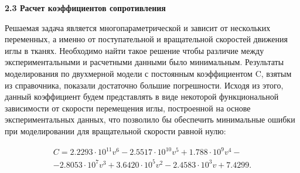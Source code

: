 \documentclass[10pt]{article}
\begin{document}
\bigskip
\textbf{2.3 Расчет коэффициентов сопротивления}

Решаемая задача является многопараметрической и зависит от нескольких переменных, а именно от поступательной и вращательной скоростей движения иглы в тканях. Необходимо найти такое решение чтобы различие между экспериментальными и расчетными данными было минимальным. 
Результаты моделирования по двухмерной модели с постоянным коэффициентом C, взятым из справочника, показали достаточно большие погрешности. Исходя из этого, данный коэффициент будем представлять в виде некоторой функциональной зависимости от скорости перемещения иглы, построенной на основе экспериментальных данных, что позволило бы обеспечить минимальные ошибки при моделировании для вращательной скорости равной нулю:

\begin{multline} \label{eq11}
C= 2.2293\cdot10^{11} v^6 - 2.5517\cdot10^{10} v^5+1.788\cdot10^9 v^4 - \\ -2.8053\cdot10^7 v^3 +3.6420\cdot10^5 v^2-2.4583\cdot10^3 v+7.4299.
\end{multline}


\bigskip
\begin{thebibliography}{99}
\small


\end{thebibliography}
\end{document}
